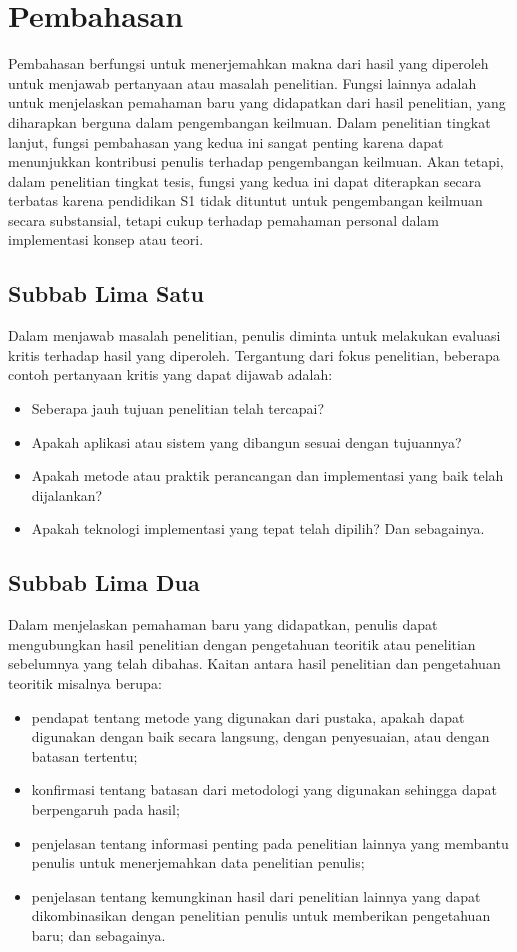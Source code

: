 \newpage
\chapter{Pembahasan}

Pembahasan berfungsi untuk menerjemahkan makna dari hasil yang diperoleh untuk menjawab pertanyaan atau masalah penelitian. Fungsi lainnya adalah untuk menjelaskan pemahaman baru yang didapatkan dari hasil penelitian, yang diharapkan berguna dalam pengembangan keilmuan. Dalam penelitian tingkat lanjut, fungsi pembahasan yang kedua ini sangat penting karena dapat menunjukkan kontribusi penulis terhadap pengembangan keilmuan. Akan tetapi, dalam penelitian tingkat tesis, fungsi yang kedua ini dapat diterapkan secara terbatas karena pendidikan S1 tidak dituntut untuk pengembangan keilmuan secara substansial, tetapi cukup terhadap pemahaman personal dalam implementasi konsep atau teori. 

\section{Subbab Lima Satu}

Dalam menjawab masalah penelitian, penulis diminta untuk melakukan evaluasi kritis terhadap hasil yang diperoleh. Tergantung dari fokus penelitian, beberapa contoh pertanyaan kritis yang dapat dijawab adalah:
\begin{itemize}
  \item Seberapa jauh tujuan penelitian telah tercapai?
  \item Apakah aplikasi atau sistem yang dibangun sesuai dengan tujuannya?
  \item Apakah metode atau praktik perancangan dan implementasi yang baik telah dijalankan?
  \item Apakah teknologi implementasi yang tepat telah dipilih? Dan sebagainya. 
\end{itemize} 

\section{Subbab Lima Dua}

Dalam menjelaskan pemahaman baru yang didapatkan, penulis dapat mengubungkan hasil penelitian dengan pengetahuan teoritik atau penelitian sebelumnya yang telah dibahas. Kaitan antara hasil penelitian dan pengetahuan teoritik misalnya berupa:
\begin{itemize}
  \item pendapat tentang metode yang digunakan dari pustaka, apakah dapat digunakan dengan baik secara langsung, dengan penyesuaian, atau dengan batasan tertentu;
  \item konfirmasi tentang batasan dari metodologi yang digunakan sehingga dapat berpengaruh pada hasil;
  \item penjelasan tentang informasi penting pada penelitian lainnya yang membantu penulis untuk menerjemahkan data penelitian penulis;
  \item penjelasan tentang kemungkinan hasil dari penelitian lainnya yang dapat dikombinasikan dengan penelitian penulis untuk memberikan pengetahuan baru; dan sebagainya. 
\end{itemize}

